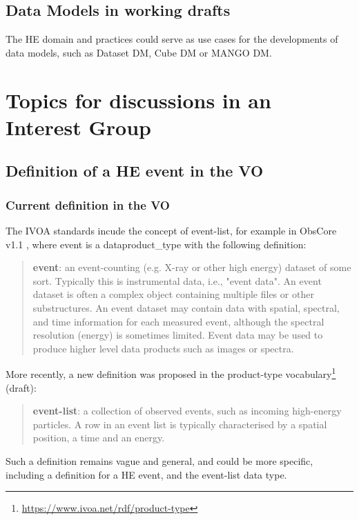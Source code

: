 \documentclass[11pt,a4paper]{ivoa}
\begin{document}


\subsection{Data Models in working drafts}

The HE domain and practices could serve as use cases for the developments of data models, such as Dataset DM, Cube DM or MANGO DM.


\section{Topics for discussions in an Interest Group}


\subsection{Definition of a HE event in the VO}
\label{sec:event-bundlle-or-list}

\subsubsection{Current definition in the VO}

The IVOA standards incude the concept of event-list, for example in ObsCore v1.1 \citep{2017ivoa.spec.0509L}, where event is a dataproduct\_type with the following definition:
\begin{quote}
    \textbf{event}: an event-counting (e.g. X-ray or other high energy) dataset of some sort. Typically this is instrumental data, i.e., "event data". An event dataset is often a complex object containing multiple files or other substructures. An event dataset may contain data with spatial, spectral, and time information for each measured event, although the spectral resolution (energy) is sometimes limited. Event data may be used to produce higher level data products such as images or spectra.
\end{quote}

More recently, a new definition was proposed in the product-type vocabulary\footnote{\url{https://www.ivoa.net/rdf/product-type}} (draft):
\begin{quote}
    \textbf{event-list}: a collection of observed events, such as incoming high-energy particles. A row in an event list is typically characterised by a spatial position, a time and an energy.
\end{quote}

Such a definition remains vague and general, and could be more specific, including a definition for a HE event, and the event-list data type.
\end{document}
